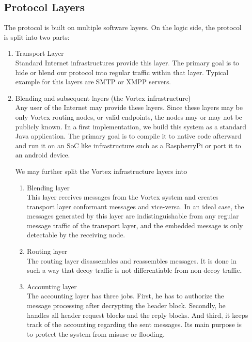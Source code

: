 \subsection{Protocol Layers}
The protocol is built on multiple software layers. On the logic side, the protocol is split into two parts:
\begin{enumerate}
	\item Transport Layer\\
	Standard Internet infrastructures provide this layer. The primary goal is to hide or blend our protocol into regular traffic within that layer. Typical example for this layers are SMTP or XMPP servers.
	\item Blending and subsequent layers (the Vortex infrastructure)\\
	Any user of the Internet may provide these layers. Since these layers may be only Vortex routing nodes, or valid endpoints, the nodes may or may not be publicly known. In a first implementation, we build this system as a standard Java application. The primary goal is to compile it to native code afterward and run it on an SoC like infrastructure such as a RaspberryPi or port it to an android device.
	
	We may further split the Vortex infrastructure layers into
	\begin{enumerate}
		\item Blending layer\\
		This layer receives messages from the Vortex system and creates transport layer conformant messages and vice-versa. In an ideal case, the messages generated by this layer are indistinguishable from any regular message traffic of the transport layer, and the embedded message is only detectable by the receiving node.
		\item Routing layer\\
		The routing layer disassembles and reassembles messages. It is done in such a way that decoy traffic is not differentiable from non-decoy traffic.
		\item Accounting layer\\
		The accounting layer has three jobs. First, he has to authorize the message processing after decrypting the header block. Secondly, he handles all header request blocks and the reply blocks. And third, it keeps track of the accounting regarding the sent messages. Its main purpose is to protect the system from misuse or flooding.    
	\end{enumerate}
\end{enumerate}

